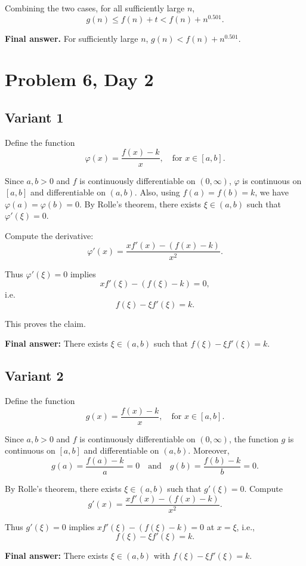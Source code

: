 \documentclass[12pt,a4paper]{article}
\theoremstyle{definition}
\begin{document}
    Combining the two cases, for all sufficiently large $n$,
    $$g(n) \leq f(n) + t < f(n) + n^{0.501}.$$

    \textbf{Final answer.}
    For sufficiently large $n$, $g(n) < f(n) + n^{0.501}$.

    \section{Problem 6, Day 2}
    \subsection{Variant 1}
    Define the function
    $$\varphi(x) = \frac{f(x) - k}{x}, \quad \text{for } x \in [a,b].$$

    Since $a, b > 0$ and $f$ is continuously differentiable on $(0,\infty)$, $\varphi$ is continuous on $[a,b]$ and differentiable on $(a,b)$. Also, using $f(a) = f(b) = k$, we have $\varphi(a) = \varphi(b) = 0$. By Rolle's theorem, there exists $\xi \in (a,b)$ such that $\varphi'(\xi) = 0$.

    Compute the derivative:
    $$\varphi'(x) = \frac{x f'(x) - (f(x) - k)}{x^2}.$$

    Thus $\varphi'(\xi) = 0$ implies
    $$x f'(\xi) - (f(\xi) - k) = 0,$$
    i.e.
    $$f(\xi) - \xi f'(\xi) = k.$$

    This proves the claim.

    \textbf{Final answer:}
    There exists $\xi \in (a,b)$ such that $f(\xi) - \xi f'(\xi) = k$.
    \subsection{Variant 2}
    Define the function
    $$g(x) = \frac{f(x) - k}{x}, \quad \text{for } x \in [a,b].$$

    Since $a, b > 0$ and $f$ is continuously differentiable on $(0, \infty)$, the function $g$ is continuous on $[a,b]$ and differentiable on $(a,b)$. Moreover,
    $$g(a) = \frac{f(a) - k}{a} = 0 \quad \text{and} \quad g(b) = \frac{f(b) - k}{b} = 0.$$

    By Rolle's theorem, there exists $\xi \in (a,b)$ such that $g'(\xi) = 0$. Compute
    $$g'(x) = \frac{x f'(x) - (f(x) - k)}{x^2}.$$

    Thus $g'(\xi) = 0$ implies $x f'(\xi) - (f(\xi) - k) = 0$ at $x = \xi$, i.e.,
    $$f(\xi) - \xi f'(\xi) = k.$$

    \textbf{Final answer:} There exists $\xi \in (a,b)$ with $f(\xi) - \xi f'(\xi) = k$.
\end{document}
